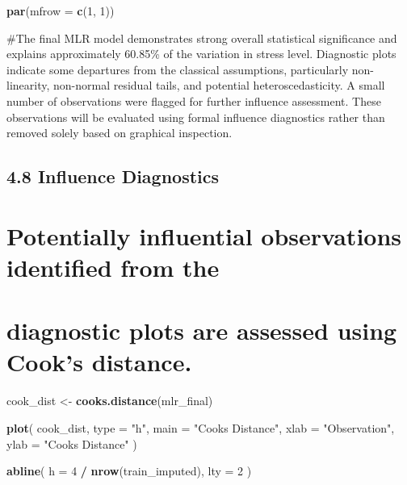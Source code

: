 \documentclass[
]{article}
\newenvironment{Shaded}{\begin{snugshade}}{\end{snugshade}}
\newcommand{\AttributeTok}[1]{\textcolor[rgb]{0.13,0.29,0.53}{#1}}
\newcommand{\DecValTok}[1]{\textcolor[rgb]{0.00,0.00,0.81}{#1}}
\newcommand{\FunctionTok}[1]{\textcolor[rgb]{0.13,0.29,0.53}{\textbf{#1}}}
\newcommand{\NormalTok}[1]{#1}
\newcommand{\OtherTok}[1]{\textcolor[rgb]{0.56,0.35,0.01}{#1}}
\newcommand{\SpecialCharTok}[1]{\textcolor[rgb]{0.81,0.36,0.00}{\textbf{#1}}}
\newcommand{\StringTok}[1]{\textcolor[rgb]{0.31,0.60,0.02}{#1}}
\begin{document}
\begin{Shaded}
\begin{Highlighting}[]
\FunctionTok{par}\NormalTok{(}\AttributeTok{mfrow =} \FunctionTok{c}\NormalTok{(}\DecValTok{1}\NormalTok{, }\DecValTok{1}\NormalTok{))}
\end{Highlighting}
\end{Shaded}

\#The final MLR model demonstrates strong overall statistical
significance and explains approximately 60.85\% of the variation in
stress level. Diagnostic plots indicate some departures from the
classical assumptions, particularly non-linearity, non-normal residual
tails, and potential heteroscedasticity. A small number of observations
were flagged for further influence assessment. These observations will
be evaluated using formal influence diagnostics rather than removed
solely based on graphical inspection.

\subsection{4.8 Influence Diagnostics}\label{influence-diagnostics}

\section{Potentially influential observations identified from
the}\label{potentially-influential-observations-identified-from-the}

\section{diagnostic plots are assessed using Cook's
distance.}\label{diagnostic-plots-are-assessed-using-cooks-distance.}

\begin{Shaded}
\begin{Highlighting}[]
\NormalTok{cook\_dist }\OtherTok{\textless{}{-}} \FunctionTok{cooks.distance}\NormalTok{(mlr\_final)}

\FunctionTok{plot}\NormalTok{(}
\NormalTok{  cook\_dist,}
  \AttributeTok{type =} \StringTok{"h"}\NormalTok{,}
  \AttributeTok{main =} \StringTok{"Cook\textquotesingle{}s Distance"}\NormalTok{,}
  \AttributeTok{xlab =} \StringTok{"Observation"}\NormalTok{,}
  \AttributeTok{ylab =} \StringTok{"Cook\textquotesingle{}s Distance"}
\NormalTok{)}

\FunctionTok{abline}\NormalTok{(}
  \AttributeTok{h =} \DecValTok{4} \SpecialCharTok{/} \FunctionTok{nrow}\NormalTok{(train\_imputed),}
  \AttributeTok{lty =} \DecValTok{2}
\NormalTok{)}
\end{Highlighting}
\end{Shaded}
\end{document}
